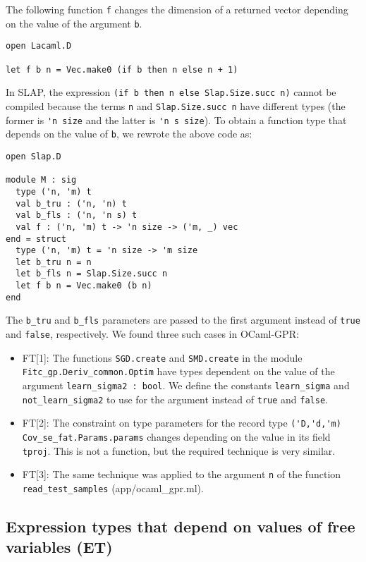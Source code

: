 \documentclass[10pt,a4paper]{article}
\begin{document}
The following function \lstinline|f| changes the dimension of a returned vector
depending on the value of the argument \lstinline|b|.
\begin{lstlisting}
open Lacaml.D

let f b n = Vec.make0 (if b then n else n + 1)
\end{lstlisting}
In SLAP, the expression \lstinline|(if b then n else Slap.Size.succ n)| cannot be compiled
because the terms \lstinline|n| and \lstinline|Slap.Size.succ n| have different types
(the former is \lstinline|'n size| and the latter is \lstinline|'n s size|).
To obtain a function type that depends on the value of \lstinline|b|, we rewrote the
above code as:
\begin{lstlisting}
open Slap.D

module M : sig
  type ('n, 'm) t
  val b_tru : ('n, 'n) t
  val b_fls : ('n, 'n s) t
  val f : ('n, 'm) t -> 'n size -> ('m, _) vec
end = struct
  type ('n, 'm) t = 'n size -> 'm size
  let b_tru n = n
  let b_fls n = Slap.Size.succ n
  let f b n = Vec.make0 (b n)
end
\end{lstlisting}
The \lstinline|b_tru| and \lstinline|b_fls| parameters are passed to the first argument instead of
\lstinline|true| and \lstinline|false|, respectively. We found three such cases in OCaml-GPR:

\begin{itemize}
\item FT[1]: The functions \lstinline|SGD.create| and \lstinline|SMD.create| in the module
  \lstinline|Fitc_gp.Deriv_common.Optim| have types dependent on the value of the argument
  \lstinline|learn_sigma2 : bool|. We define the constants \lstinline|learn_sigma| and
  \lstinline|not_learn_sigma2| to use for the argument instead of \lstinline|true| and
  \lstinline|false|.
\item FT[2]: The constraint on type parameters for the record type
   \lstinline|('D,'d,'m) Cov_se_fat.Params.params| changes depending on the value in
   its field \lstinline|tproj|.
   This is not a function, but the required technique is very similar.
\item FT[3]: The same technique was applied to the argument \lstinline|n| of the function
  \lstinline|read_test_samples| (app/ocaml\_gpr.ml).
\end{itemize}

\subsection{Expression types that depend on values of free variables (ET)}
\label{sec:ET}
\end{document}
